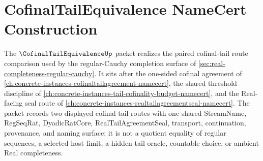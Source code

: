 \chapter{CofinalTailEquivalence NameCert Construction}
\label{ch:concrete-instances-cofinaltailequivalence-namecert}

The $\CofinalTailEquivalenceUp$ packet realizes the paired cofinal-tail route comparison used by the regular-Cauchy completion surface of \autoref{sec:real-completeness-regular-cauchy}. It sits after the one-sided cofinal agreement of \autoref{ch:concrete-instances-cofinaltailagreement-namecert}, the shared threshold discipline of \autoref{ch:concrete-instances-tail-cofinality-budget-namecert}, and the Real-facing seal route of \autoref{ch:concrete-instances-realtailagreementseal-namecert}. The packet records two displayed cofinal tail routes with one shared StreamName, RegSeqRat, DyadicRatCore, RealTailAgreementSeal, transport, continuation, provenance, and naming surface; it is not a quotient equality of regular sequences, a selected host limit, a hidden tail oracle, countable choice, or ambient Real completeness.



